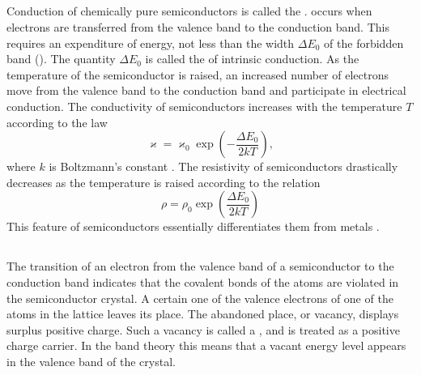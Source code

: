 \subsection{}\label{41.10.2}

Conduction of chemically pure semiconductors is called the .  occurs when electrons are transferred from the valence band to the conduction band. This requires an expenditure of energy, not less than the width \(\Delta E_0\) of the forbidden band (). The quantity \(\Delta E_0\) is called the  of intrinsic conduction. As the temperature of the semiconductor is raised, an increased number of electrons move from the valence band to the conduction band and participate in electrical conduction. The conductivity  of semiconductors increases with the temperature \(T\) according to the law
\begin{equation*}%
\varkappa = \varkappa_{0} \exp \left(-\frac{\Delta E_{0}}{2kT} \right), 
\end{equation*}
where \(k\) is Boltzmann's constant . The resistivity  of semiconductors drastically decreases as the temperature is raised according to the relation
\begin{equation*}%
\rho = \rho_{0} \exp \left(\frac{\Delta E_{0}}{2kT} \right)
\end{equation*}
This feature of semiconductors essentially differentiates them from metals .

\subsection{}\label{41.10.3}

The transition of an electron from the valence band of a semiconductor to the conduction band indicates that the covalent bonds  of the atoms are violated in the semiconductor crystal. A certain one of the valence electrons of one of the atoms in the lattice leaves its place. The abandoned place, or vacancy, displays surplus positive charge. Such a vacancy is called a , and is treated as a positive charge carrier. In the band theory this means that a vacant energy level appears in the valence band of the crystal.

